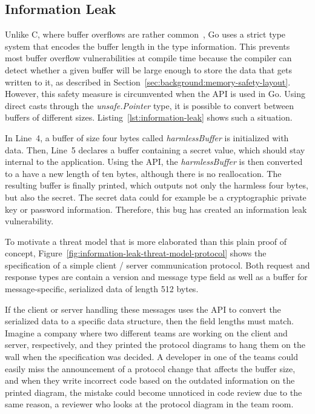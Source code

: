 \subsection{Information Leak}\label{subsec:unsafe-security-problems:buffer-overflow:information-leak}

Unlike C, where buffer overflows are rather common~\cite{larochelle2001}, Go uses a strict type system that encodes the
buffer length in the type information.
This prevents most buffer overflow vulnerabilities at compile time because the compiler can detect whether a given
buffer will be large enough to store the data that gets written to it, as described in
Section~\ref{sec:background:memory-safety-layout}.
However, this safety measure is circumvented when the \unsafe{} \acrshort{API} is used in Go.
Using direct casts through the \textit{unsafe.Pointer} type, it is possible to convert between buffers of different
sizes.
Listing~\ref{lst:information-leak} shows such a situation.



In Line~4, a buffer of size four bytes called \textit{harmlessBuffer} is initialized with data.
Then, Line~5 declares a buffer containing a secret value, which should stay internal to the application.
Using the \unsafe{} \acrshort{API}, the \textit{harmlessBuffer} is then converted to a have a new length of ten bytes,
although there is no reallocation.
The resulting buffer is finally printed, which outputs not only the harmless four bytes, but also the secret.
The secret data could for example be a cryptographic private key or password information.
Therefore, this bug has created an information leak vulnerability.

To motivate a threat model that is more elaborated than this plain proof of concept,
Figure~\ref{fig:information-leak-threat-model-protocol} shows the specification of a simple client / server
communication protocol.
Both request and response types are contain a version and message type field as well as a buffer for message-specific,
serialized data of length 512 bytes.



If the client or server handling these messages uses the \unsafe{} \acrshort{API} to convert the serialized data to a
specific data structure, then the field lengths must match.
Imagine a company where two different teams are working on the client and server, respectively, and they printed the
protocol diagrams to hang them on the wall when the specification was decided.
A developer in one of the teams could easily miss the announcement of a protocol change that affects the buffer size,
and when they write incorrect code based on the outdated information on the printed diagram, the mistake could become
unnoticed in code review due to the same reason, a reviewer who looks at the protocol diagram in the team room.


